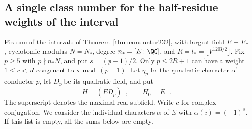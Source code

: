 \documentclass[a4paper,11pt]{article}
\theoremstyle{definition}
\theoremstyle{remark}
\numberwithin{equation}{section}
\begin{document}
\subsection{A single class number for the half-residue weights of the interval}
\label{sec:jointweights644}

Fix one of the intervals of Theorem~\ref{thm:conductor232}, with
largest field \(E=E_*\), cyclotomic modulus \(N=N_*\), degree
\(n_*=[E:\QQ]\), and \(R=t_*=\lfloor V^{1203/2}\rfloor\).
Fix \(p\ge5\) with \(p\nmid n_*N\), and put \(s=(p-1)/2\).
Only \(p\le2R+1\) can have a weight \(1\le r<R\) congruent to
\(s\bmod(p-1)\). Let \(\eta_p\) be the quadratic character of
conductor \(p\), let \(D_p\) be its quadratic field, and put
\[
                H=(E D_p)^+,\qquad H_0=E^+ .
\]
The superscript denotes the maximal real subfield. Write \(c\)
for complex conjugation. We consider the individual characters
\(\alpha\) of \(E\) with \(\alpha(c)=(-1)^s\). If this list is
empty, all the sums below are empty.
\end{document}
